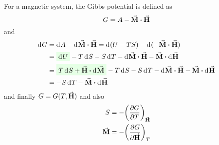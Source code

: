 \documentclass[../main/main.tex]{subfiles}
\begin{document}
For a magnetic system, the Gibbs potential is defined as
\begin{equation}
  G = A - \va{M} \vdot \va{H}
  \label{eq:}
\end{equation}
and
\begin{equation}
\begin{split}
\dd[]{G} &= \dd[]{A} - \dd[]{\va{M} \vdot \va{H}  }  = \dd[]{(U-T S)} - \dd[]{(-\va{M} \vdot \va{H})  } \\
  & = \mathcolorbox{green!10}{\dd[]{U} } - T \dd[]{S} - S \dd[]{T} - \dd[]{\va{M} } \vdot \va{H} - \va{M} \vdot \dd[]{\va{H} }  \\
& = \mathcolorbox{green!10}{T \dd[]{S} + \va{H} \vdot \dd[]{\va{M} }} - T \dd[]{S} - S \dd[]{T} - \dd[]{\va{M} } \vdot \va{H} - \va{M} \vdot \dd[]{\va{H} }  \\
 & = - S \dd[]{T} - \va{M}\vdot \dd[]{\va{H} }
\end{split}
  \label{eq:}
\end{equation}
and finally \( G=G(T,\va{H} ) \) and also
\begin{subequations}
\begin{align}
  S &= - \qty(\pdv{G}{T} )_{\va{H} } \\
  \va{M}  &= - \qty(\pdv{G}{ \va{H} } )_{T}
\end{align}
\label{}
\end{subequations}
\end{document}
